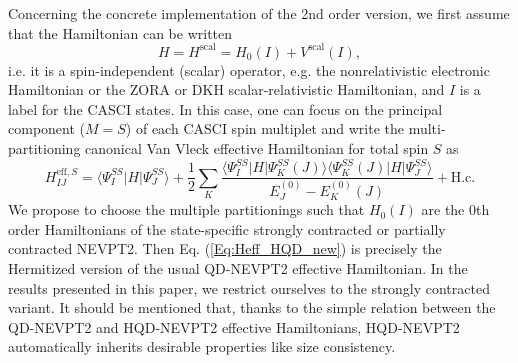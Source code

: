 Concerning the concrete implementation of the 2nd order version, we first assume that the Hamiltonian can be written
	\begin{equation}
	H = {H^{{\text{scal}}}} = {H_0}(I) + {V^{{\text{scal}}}}(I),
	\end{equation} 	
i.e. it is a spin-independent (scalar) operator, e.g. the nonrelativistic electronic Hamiltonian or the ZORA\cite{LenthBS_1993_4597, Wuelle_1998_392} or DKH\cite{Hess_1986_3742, JanseH_1989_6016} scalar-relativistic Hamiltonian, and $I$ is a label for the CASCI states. In this case, one can focus on the principal component ($M=S$) of each CASCI spin multiplet and write the multi-partitioning canonical Van Vleck effective Hamiltonian for total spin $S$ as
	\begin{equation}
	\label{Eq:Heff_HQD_new}
	H_{IJ}^{{\text{eff}},S} = \langle \Psi _I^{SS}|H|\Psi _J^{SS}\rangle  + \frac{1}{2}\sum\limits_K {\frac{{\langle \Psi _I^{SS}|H|{\Psi_K^{SS}}(J)\rangle \langle {\Psi_K^{SS}}(J)|H|\Psi _J^{SS}\rangle }}{{E_J^{(0)} - E_K^{(0)}(J)}}}  + {\text{H.c.}}
	\end{equation} 	
We propose to choose the multiple partitionings such that ${H_0}(I)$ are the 0th order Hamiltonians of the state-specific strongly contracted or partially contracted NEVPT2. Then Eq. (\ref{Eq:Heff_HQD_new}) is precisely the Hermitized version of the usual QD-NEVPT2\cite{AngelBCC_2004_4043} effective Hamiltonian. In the results presented in this paper, we restrict ourselves to the strongly contracted variant. It should be mentioned that, thanks to the simple relation between the QD-NEVPT2 and HQD-NEVPT2 effective Hamiltonians, HQD-NEVPT2 automatically inherits desirable properties like size consistency.

